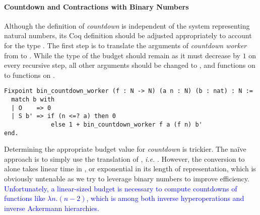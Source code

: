 \paragraph*{Countdown and Contractions with Binary Numbers}

Although the definition of \emph{countdown} is independent of the system representing natural numbers, its Coq definition should be adjusted appropriately to account for the type . The first step is to translate the arguments of \emph{countdown worker} from  to . While the type of the budget  should remain  as it must decrease by $1$ on every recursive step, all other  arguments should be changed to , and functions on  to functions on .
\begin{lstlisting}
Fixpoint bin_countdown_worker (f : N -> N) (a n : N) (b : nat) : N :=
  match b with
  | O    => 0
  | S b' => if (n <=? a) then 0
             else 1 + bin_countdown_worker f a (f n) b'
end.
\end{lstlisting}
Determining the appropriate budget value for \emph{countdown} is trickier. 
The naïve approach is to simply use the  translation of , 
\emph{i.e.} . However, the conversion to  alone 
takes linear time in , or exponential in its length of representation, 
which is obviously untenable as we try to leverage binary numbers 
to improve efficiency. 
\textcolor{blue}{
Unfortunately, a linear-sized budget is necessary to compute countdowns of functions like $\lambda n.(n-2)$, which is among both inverse hyperoperations and inverse Ackermann hierarchies.
}

